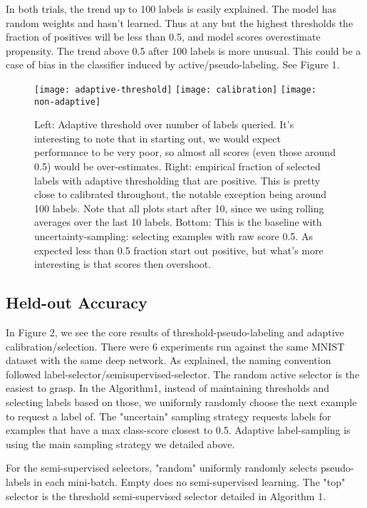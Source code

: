 \documentclass{article}
\begin{document}
In both trials, the trend up to 100 labels is easily explained.  The model has random weights and hasn't learned.  Thus at any but the highest thresholds the fraction of positives will be less than 0.5, and model scores overestimate propensity.  The trend above 0.5 after 100 labels is more unusual.  This could be a case of bias in the classifier induced by active/pseudo-labeling.  See Figure 1.  

\begin{figure}[h]
  \center 
  \texttt{[image: adaptive-threshold]}
  \texttt{[image: calibration]}
  \texttt{[image: non-adaptive]}
  \caption{Left: Adaptive threshold over number of labels queried.  It's interesting to note that in starting out, we would expect performance to be very poor, so almost all scores (even those around 0.5) would be over-estimates.  
  Right: empirical fraction of selected labels with adaptive thresholding that are positive.  This is pretty close to calibrated throughout, the notable exception being around 100 labels.  Note that all plots start after 10, since we using rolling averages over the last 10 labels.  
  Bottom: This is the baseline with uncertainty-sampling: selecting examples with raw score 0.5.  As expected less than 0.5 fraction start out positive, but what's more interesting is that scores then overshoot.  }
\end{figure}
\subsection{Held-out Accuracy}
In Figure 2, we see the core results of threshold-pseudo-labeling and adaptive calibration/selection.  There were 6 experiments run against the same MNIST dataset with the same deep network.  As explained, the naming convention followed label-selector/semisupervised-selector.  The random active selector is the easiest to grasp.  In the Algorithm1, instead of maintaining thresholds and selecting labels based on those, we uniformly randomly choose the next example to request a label of.  The "uncertain" sampling strategy requests labels for examples that have a max class-score closest to 0.5.  Adaptive label-sampling is using the main sampling strategy we detailed above.

For the semi-supervised selectors, "random" uniformly randomly selects pseudo-labels in each mini-batch.  Empty does no semi-supervised learning.  The "top" selector is the threshold semi-supervised selector detailed in Algorithm 1.  
\end{document}
